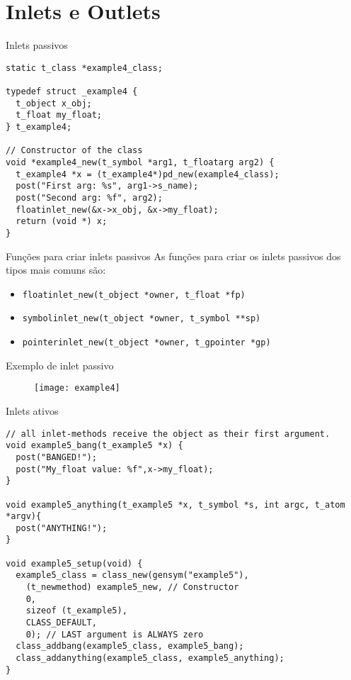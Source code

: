\section{Inlets e Outlets}

\begin{frame}[fragile]{Inlets passivos}
\begin{lstlisting}
static t_class *example4_class;

typedef struct _example4 {
  t_object x_obj;
  t_float my_float;
} t_example4;

// Constructor of the class
void *example4_new(t_symbol *arg1, t_floatarg arg2) {
  t_example4 *x = (t_example4*)pd_new(example4_class);
  post("First arg: %s", arg1->s_name);
  post("Second arg: %f", arg2);
  floatinlet_new(&x->x_obj, &x->my_float);
  return (void *) x;
}
\end{lstlisting}
\end{frame}


\begin{frame}{Funções para criar inlets passivos}
As funções para criar os inlets passivos dos tipos mais comuns são:
\begin{itemize}
\item \texttt{floatinlet\_new(t\_object *owner, t\_float *fp)}
\item \texttt{symbolinlet\_new(t\_object *owner, t\_symbol **sp)}
\item \texttt{pointerinlet\_new(t\_object *owner, t\_gpointer *gp)}
\end{itemize}
\end{frame}


\begin{frame}{Exemplo de inlet passivo}
\begin{figure}[h!]
\centering
\texttt{[image: example4]}
\label{fig:inlet-passivo}
\end{figure}
\end{frame}


\begin{frame}[fragile]{Inlets ativos}
\begin{lstlisting}
// all inlet-methods receive the object as their first argument.
void example5_bang(t_example5 *x) { 
  post("BANGED!");
  post("My_float value: %f",x->my_float);
}

void example5_anything(t_example5 *x, t_symbol *s, int argc, t_atom *argv){
  post("ANYTHING!");
}

void example5_setup(void) {
  example5_class = class_new(gensym("example5"),
    (t_newmethod) example5_new, // Constructor
    0, 
    sizeof (t_example5),
    CLASS_DEFAULT,
    0); // LAST argument is ALWAYS zero
  class_addbang(example5_class, example5_bang);
  class_addanything(example5_class, example5_anything);
}
\end{lstlisting}
\end{frame}

